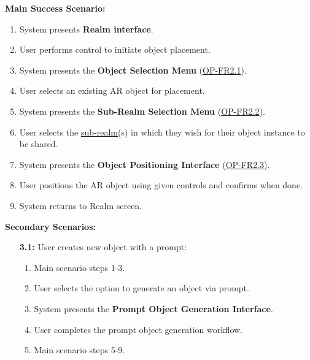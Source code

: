 \documentclass{article}
\begin{document}
\begin{enumerate}[label=\textbf{UC\arabic*}]
          \textbf{Main Success Scenario:}
          \begin{enumerate}[label=\textbf{\arabic*.}]
              \item System presents \textbf{Realm interface}.
              \item User performs control to initiate object placement.
              \item System presents the \textbf{Object Selection Menu} (\hyperref[ssub:object_placement]{OP-FR2.1}).
              \item User selects an existing AR object for placement.
              \item System presents the \textbf{Sub-Realm Selection Menu} (\hyperref[ssub:object_placement]{OP-FR2.2}).
              \item User selects the \hyperref[def:sub_realm]{sub-realm}(s) in which they wish for their object instance to be shared.
              \item System presents the \textbf{Object Positioning Interface} (\hyperref[ssub:object_placement]{OP-FR2.3}).
              \item User positions the AR object using given controls and confirms when done.
              \item System returns to Realm screen.
          \end{enumerate}

          \textbf{Secondary Scenarios:}
          \begin{itemize}
              \item[{\bf 3.1:}] User creates new object with a prompt:
                    \begin{enumerate}[label=\textbf{\arabic*.}]
                        \item Main scenario steps 1-3.
                        \item User selects the option to generate an object via prompt.
                        \item System presents the \textbf{Prompt Object Generation Interface}.
                        \item User completes the prompt object generation workflow.
                        \item Main scenario steps 5-9.
                    \end{enumerate}


\end{itemize}
\end{enumerate}
\end{document}
